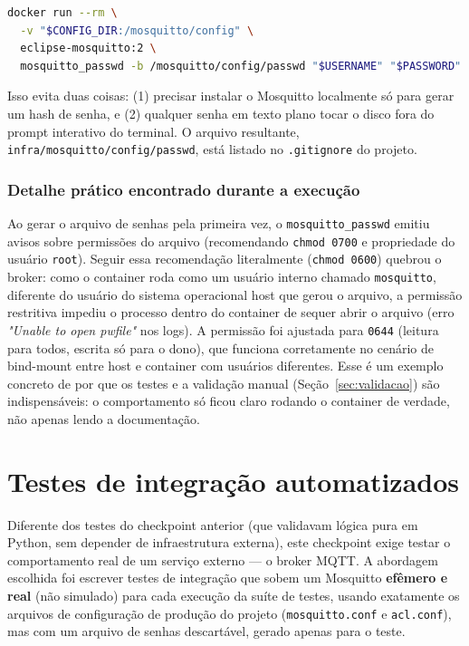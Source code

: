 \documentclass[11pt,a4paper]{article}
\begin{document}
\begin{lstlisting}[language=bash,caption={infra/mosquitto/generate\_passwd.sh (resumido)}]
docker run --rm \
  -v "$CONFIG_DIR:/mosquitto/config" \
  eclipse-mosquitto:2 \
  mosquitto_passwd -b /mosquitto/config/passwd "$USERNAME" "$PASSWORD"
\end{lstlisting}

Isso evita duas coisas: (1) precisar instalar o Mosquitto localmente só para gerar um hash de senha, e (2) qualquer senha em texto plano tocar o disco fora do prompt interativo do terminal. O arquivo resultante, \texttt{infra/mosquitto/config/passwd}, está listado no \texttt{.gitignore} do projeto.

\subsubsection*{Detalhe prático encontrado durante a execução}

Ao gerar o arquivo de senhas pela primeira vez, o \texttt{mosquitto\_passwd} emitiu avisos sobre permissões do arquivo (recomendando \texttt{chmod 0700} e propriedade do usuário \texttt{root}). Seguir essa recomendação literalmente (\texttt{chmod 0600}) quebrou o broker: como o container roda como um usuário interno chamado \texttt{mosquitto}, diferente do usuário do sistema operacional host que gerou o arquivo, a permissão restritiva impediu o processo dentro do container de sequer abrir o arquivo (erro \textit{"Unable to open pwfile"} nos logs). A permissão foi ajustada para \texttt{0644} (leitura para todos, escrita só para o dono), que funciona corretamente no cenário de bind-mount entre host e container com usuários diferentes. Esse é um exemplo concreto de por que os testes e a validação manual (Seção~\ref{sec:validacao}) são indispensáveis: o comportamento só ficou claro rodando o container de verdade, não apenas lendo a documentação.

\section{Testes de integração automatizados}

Diferente dos testes do checkpoint anterior (que validavam lógica pura em Python, sem depender de infraestrutura externa), este checkpoint exige testar o comportamento real de um serviço externo --- o broker MQTT. A abordagem escolhida foi escrever testes de integração que sobem um Mosquitto \textbf{efêmero e real} (não simulado) para cada execução da suíte de testes, usando exatamente os arquivos de configuração de produção do projeto (\texttt{mosquitto.conf} e \texttt{acl.conf}), mas com um arquivo de senhas descartável, gerado apenas para o teste.
\end{document}
